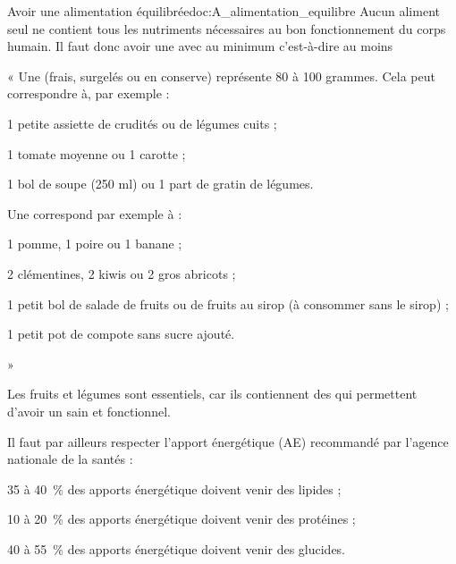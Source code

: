 \begin{doc}{Avoir une alimentation équilibrée}{doc:A_alimentation_equilibre}
  Aucun aliment seul ne contient tous les nutriments nécessaires au bon fonctionnement du corps humain.
  Il faut donc avoir une  avec au minimum  c'est-à-dire au moins 

  \begin{importants}
    « Une  (frais, surgelés ou en conserve) représente 80 à 100 grammes. Cela peut correspondre à, par exemple :
    \begin{listePoints}
      \item 1 petite assiette de crudités ou de légumes cuits ;
      \item 1 tomate moyenne ou 1 carotte ;
      \item 1 bol de soupe (250 ml) ou 1 part de gratin de légumes.
    \end{listePoints}
    Une  correspond par exemple à :
    \begin{listePoints}
      \item 1 pomme, 1 poire ou 1 banane ;
      \item 2 clémentines, 2 kiwis ou 2 gros abricots ;
      \item 1 petit bol de salade de fruits ou de fruits au sirop (à consommer sans le sirop) ;
      \item 1 petit pot de compote sans sucre ajouté.
    \end{listePoints}
     »
  \end{importants}

  Les fruits et légumes sont essentiels, car ils contiennent des  qui permettent d'avoir un  sain et fonctionnel.

  \begin{importants}  
    Il faut par ailleurs respecter l'apport énergétique (AE) recommandé par l'agence nationale de la santés :
    \begin{listePoints}
      \item \num{35} à \qty{40}{\percent} des apports énergétique doivent venir des lipides ;
      \item \num{10} à \qty{20}{\percent} des apports énergétique doivent venir des protéines ;
      \item \num{40} à \qty{55}{\percent} des apports énergétique doivent venir des glucides.
    \end{listePoints}
  \end{importants}
\end{doc}

